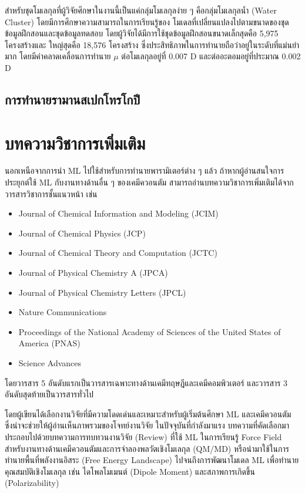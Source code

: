 สำหรับชุดโมเลกุลที่ผู้วิจัยศึกษาในงานนี้เป็นแค่กลุ่มโมเลกุลง่าย ๆ คือกลุ่มโมเลกุลน้ำ (Water Cluster) โดยมีการศึกษาความสามารถในการเรียนรู้ของ%
โมเดลที่เปลี่ยนแปลงไปตามขนาดของชุดข้อมูลฝึกสอนและชุดข้อมูลทดสอบ โดยผู้วิจัยได้มีการใช้ชุดข้อมูลฝึกสอนขนาดเล็กสุดคือ 5,975 โครงสร้างและ%
ใหญ่สุดคือ 18,576 โครงสร้าง ซึ่งประสิทธิภาพในการทำนายถือว่าอยู่ในระดับที่แม่นยำมาก โดยมีค่าคลาดเคลื่อนการทำนาย $\mu$ ต่อโมเลกุลอยู่ที่
0.007 D และต่ออะตอมอยู่ที่ประมาณ 0.002 D

\subsection{การทำนายรามานสเปกโทรโกปี}
\label{ssec:pred_spec_raman}

\section{บทความวิชาการเพิ่มเติม}
\label{sec:pred_misc_papers}

นอกเหนือจากการนำ ML ไปใช้สำหรับการทำนายพารามิเตอร์ต่าง ๆ แล้ว ถ้าหากผู้อ่านสนใจการประยุกต์ใช้ ML กับงานทางด้านอื่น ๆ ของเคมีควอนตัม 
สามารถอ่านบทความวิชาการเพิ่มเติมได้จากวารสารวิชาการชั้นแนวหน้า เช่น 

\begin{itemize}[noitemsep]
    \item Journal of Chemical Information and Modeling (JCIM) 
    \item Journal of Chemical Physics (JCP)
    \item Journal of Chemical Theory and Computation (JCTC)
    \item Journal of Physical Chemistry A (JPCA)
    \item Journal of Physical Chemistry Letters (JPCL)
    \item Nature Communications
    \item Proceedings of the National Academy of Sciences of the United States of America (PNAS)
    \item Science Advances
\end{itemize}

\noindent โดยวารสาร 5 อันดับแรกเป็นวารสารเฉพาะทางด้านเคมีทฤษฎีและเคมีคอมพิวเตอร์ และวารสาร 3 อันดับสุดท้ายเป็นวารสารทั่วไป

โดยผู้เขียนได้เลือกงานวิจัยที่มีความโดดเด่นและเหมาะสำหรับผู้เริ่มต้นศึกษา ML และเคมีควอนตัม ซึ่งน่าจะช่วยให้ผู้อ่านเห็นภาพรวมของโจทย์งานวิจัย%
ในปัจจุบันที่กำลังมาแรง บทความที่คัดเลือกมาประกอบไปด้วยบทความการทบทวนงานวิจัย (Review) ที่ใช้ ML ในการเรียนรู้ Force Field 
สำหรับงานทางด้านเคมีควอนตัมและการจําลองพลวัตเชิงโมเลกุล (QM/MD) หรือนำมาใช้ในการทำนายพื้นที่พลังงานอิสระ (Free Energy Landscape)
ไปจนถึงการพัฒนาโมเดล ML เพื่อทำนายคุณสมบัติเชิงโมเลกุล เช่น ไดโพลโมเมนต์ (Dipole Moment) และสภาพการเกิดขึ้น (Polarizability)

